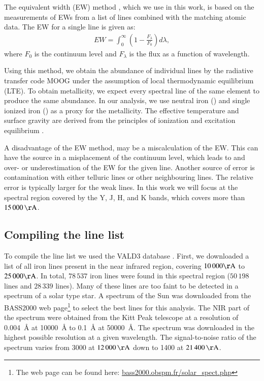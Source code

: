 \documentclass{aa}
\begin{document}
The equivalent width (EW) method
\citep[see e.g.][]{Sousa2008a,Mucciarelli2013,Bensby2014}, which we use
in this work, is based on the measurements of EWs from a list of lines
combined with the matching atomic data. The EW for a single line is
given as:
\begin{align}
    \label{eq:EW}
    EW = \int_0^\infty \left(1 - \frac{F_\lambda}{F_0}\right) d\lambda,
\end{align}
where $F_0$ is the continuum level and $F_\lambda$ is the flux as a
function of wavelength.

Using this method, we obtain the abundance of individual lines by
the radiative transfer code MOOG \citep[][version 2013]{Sneden1973}
under the assumption of local thermodynamic equilibrium (LTE). To
obtain metallicity, we expect every spectral line of the same element
to produce the same abundance. In our analysis, we use neutral iron
() and single ionized iron () as a proxy for
the metallicity. The effective temperature and surface gravity are
derived from the principles of ionization and excitation equilibrium
\citep[see][]{Gray2006}.


A disadvantage of the EW method, may be a miscalculation of the EW. This
can have the source in a misplacement of the continuum level, which
leads to and over- or underestimation of the EW for the given line.
Another source of error is contamination with either telluric lines or
other neighbouring lines. The relative error is typically larger for the
weak lines. In this work we will focus at the spectral region covered by
the Y, J, H, and K bands, which covers more than $\SI{15000}{\AA}$.



\subsection{Compiling the line list}

To compile the line list we used the VALD3 database \citep{VALD1,VALD2}.
First, we downloaded a list of all iron lines present in the near
infrared region, covering $10\,000\si{\AA}$ to $25\,000\si{\AA}$.
In total, $78\,537$ iron lines were found in this spectral region
($50\,198$  lines and $28\,339$  lines).
Many of these lines are too faint to be detected in a spectrum
of a solar type star. A spectrum of the Sun was downloaded from
the BASS2000 web page\footnote{The web page can be found here:
\url{bass2000.obspm.fr/solar_spect.php}} to select the best lines
for this analysis. The NIR part of the spectrum were obtained from
the Kitt Peak telescope \citep{Hinkle1995} at a resolution of
\SI{0.004}{\angstrom} at \SI{10000}{\angstrom} to \SI{0.1}{\angstrom}
at \SI{50000}{\angstrom}. The spectrum was downloaded in the highest
possible resolution at a given wavelength. The signal-to-noise ratio
of the spectrum varies from 3000 at $\SI{12000}{\AA}$ down to 1400 at
$\SI{21400}{\AA}$.
\end{document}
